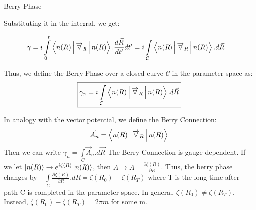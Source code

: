 \documentclass[12pt, oneside, listof=totoc,dvipsnames]{scrbook}
\begin{document}
\begin{chapter}{Berry Phase}
		
		
		
		Substituting it in the integral, we get:
		
		
		\begin{align*}
			&\gamma =   i \int \limits_0^t \Braket{n(R)|\overrightarrow{\triangledown}_R |n(R)}. \frac{d\vec{R}}{dt'}dt'=
			i \int \limits_\mathcal{C} \Braket{n(R)|\overrightarrow{\triangledown}_R |n(R)}. d\vec{R}
		\end{align*}
		
		Thus, we define the Berry Phase over a closed curve $\mathcal{C}$ in the parameter space as:
		\[ \boxed{\gamma_n=i \int \limits_\mathcal{C} \Braket{n(R)|\overrightarrow{\triangledown}_R |n(R)}. d\vec{R}}\]
		
		
		In analogy with the vector potential, we define the Berry Connection: $$\vec{A}_n=\Braket{n(R)|\overrightarrow{\triangledown}_R |n(R)}$$
		Then we can write $\gamma_n = \int \limits_C \vec{A}_n.d\vec{R}$
		The Berry Connection is gauge dependent. If we let $\ket{n(R)}\rightarrow e^{i\zeta(R)} \ket{n(R)}$, then $A \rightarrow A-\frac{\partial \zeta(R)}{\partial R}$. Thus, the berry phase changes by $-\int \limits_C \frac{\partial \zeta(R)}{\partial R} . dR = \zeta(R_0)-\zeta(R_T) $ where T is the long time after path C is completed in the parameter space. In general, $\zeta(R_0)\neq \zeta(R_T)$. Instead, $\zeta(R_0)- \zeta(R_T)= 2\pi m $ for some m.
		
		
		
		\begin{center}
			
			
			
			\begin{tikzpicture}[x=0.75pt,y=0.75pt,yscale=-1,xscale=1]
				

\end{tikzpicture}
\end{center}
\end{chapter}
\end{document}

